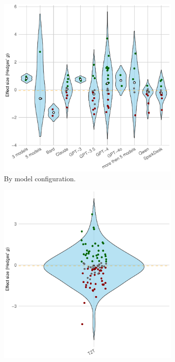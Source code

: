 \documentclass[manuscript, screen, review, acmsmall, anonymous]{acmart}
\begin{document}
\begin{figure}[h]
  \centering
  \begin{subfigure}[t]{0.49\linewidth}
    \centering
    \includegraphics[width=\linewidth]{plot_versus_raw_violin_GenAI_Model}
    \caption{By model configuration.}
    \label{fig:versus_raw_violin_genai_model}
  \end{subfigure}%
  \hfill
  \begin{subfigure}[t]{0.49\linewidth}
    \centering
    \includegraphics[width=\linewidth]{plot_versus_raw_violin_GenAI_Type}

\end{subfigure}
\end{figure}
\end{document}
